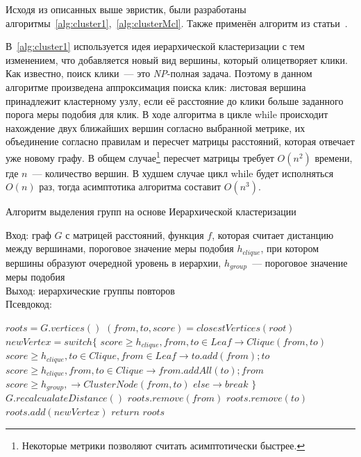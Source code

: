 Исходя из описанных выше эвристик, были разработаны алгоритмы~\ref{alg:cluster1},~\ref{alg:clusterMcl}.
Также применён алгоритм из статьи~\cite{tofigh2009optimum}.

В~\ref{alg:cluster1} используется идея иерархической кластеризации с тем изменением, что добавляется новый вид вершины, который олицетворяет клики.
Как известно, поиск клики~--- это \emph{NP}-полная задача.
Поэтому в данном алгоритме произведена аппроксимация поиска клик: листовая вершина принадлежит кластерному узлу, если её расстояние до клики больше заданного порога меры подобия для клик.
В ходе алгоритма в цикле while происходит нахождение двух ближайших вершин согласно выбранной метрике, их объединение согласно правилам и пересчет матрицы расстояний, которая отвечает уже новому графу.
В общем случае\footnote{Некоторые метрики позволяют считать асимптотически быстрее.} пересчет матрицы требует $O(n^2)$ времени, где $n$~--- количество вершин.
В худшем случае  цикл while будет исполняться $O(n)$ раз,
тогда асимптотика алгоритма составит $O(n^3)$.

\begin{algorithm}[t!]
\caption{Алгоритм выделения групп на основе Иерархической кластеризации}\label{alg:cluster1}
Вход: граф $G$ с матрицей расстояний, функция  $f$, которая считает дистанцию между вершинами, пороговое значение меры подобия $h_{clique}$, при котором вершины образуют очередной уровень в иерархии, $h_{group}$~--- пороговое значение меры подобия\\
Выход: иерархические группы повторов \\
Псевдокод:
\begin{algorithmic}[1]
\State $roots = G.vertices()$
\State $(from, to,score) = closestVertices(root)$
\State $newVertex = switch \{$
\State $score\geq h_{clique} , from,to \in Leaf \rightarrow Clique(from,to) $
\State $score\geq h_{clique} , to \in Clique,from \in Leaf \rightarrow to.add(from);to $
\State $score\geq h_{clique} , from,to \in Clique \rightarrow from.addAll(to);from$
\State $score\geq h_{group}, \rightarrow ClusterNode(from,to) $
\State $else \rightarrow break$ 
\State $\}$
\State $G.recalcualateDistance()$
\State $roots.remove(from)$
\State $roots.remove(to)$
\State $roots.add(newVertex)$
\EndWhile
\State $return$ $roots$
\end{algorithmic}
\end{algorithm}


